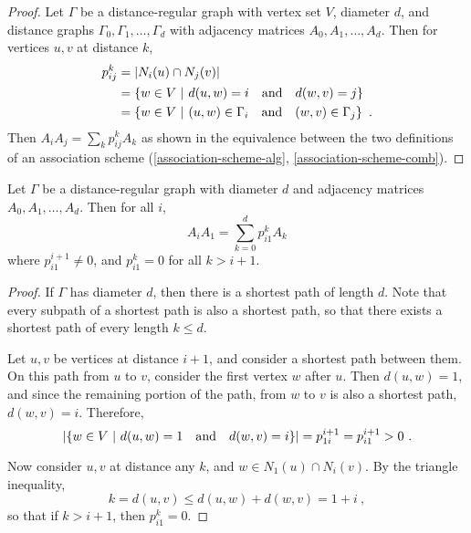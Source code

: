 \documentclass{report}
\begin{document}
    \begin{proof}\label{drg-mult-closed}
      Let $\Gamma$ be a distance-regular graph with vertex set $V$, diameter
      $d$, and distance graphs $\Gamma_0, \Gamma_1, \ldots, \Gamma_d$
      with adjacency matrices $A_0, A_1, \ldots, A_d$.
      Then for vertices $u, v$ at distance $k$,
      \begin{alignat*}{2}
        p_{ij}^k &= \left\lvert N_i(u) \cap N_j(v) \right\rvert \\
        &= \left\lbrace  w \in V \ \middle| \ d(u, w) = i \quad\text{and}\quad d(w, v) = j  \right\rbrace \\
        &= \left\lbrace  w \in V \ \middle| \ (u, w) \in \Gamma_i \quad\text{and}\quad (w, v) \in \Gamma_j  \right\rbrace
        \ .
      \end{alignat*}
      Then $A_i A_j = \sum_k p_{ij}^k A_k$ as shown in the equivalence between
      the two definitions of an association scheme
      (\ref{association-scheme-alg}, \ref{association-scheme-comb}).
    \end{proof}

    \begin{lem}\label{drg-mult-restricted}
      Let $\Gamma$ be a distance-regular graph with diameter $d$ and
      adjacency matrices $A_0, A_1, \ldots, A_d$.  Then for all $i$,
      $$
        A_i A_1 = \sum_{k=0}^d p_{i1}^k A_k
      $$
      where $p_{i1}^{i+1} \neq 0$,
      and $p_{i1}^k = 0$ for all $k > i + 1$.
    \end{lem}

    \begin{proof}
      If $\Gamma$ has diameter $d$, then there is a shortest path of length $d$.
      Note that every subpath of a shortest path is also a shortest path, so
      that there exists a shortest path of every length $k \leq d$.

      Let $u, v$ be vertices at distance $i+1$, and consider a shortest path
      between them.  On this path from $u$ to $v$, consider the first vertex $w$
      after $u$.  Then $d(u, w) = 1$, and since the remaining portion of the
      path, from $w$ to $v$ is also a shortest path, $d(w, v) = i$.  Therefore,
      $$
      \left\lvert \left\lbrace  w \in V \ \middle| \ d(u, w) = 1 \quad\text{and}\quad d(w, v) = i  \right\rbrace \right\rvert
      = p_{1i}^{i+1} = p_{i1}^{i+1} > 0 \ .
      $$

      Now consider $u, v$ at distance any $k$, and $w \in N_1(u) \cap N_i(v)$.
      By the triangle inequality,
      $$
        k = d(u, v) \leq d(u, w) + d(w, v)
        = 1 + i
        \ ,
      $$
      so that if $k > i + 1$, then $p_{i1}^k = 0$.
    \end{proof}
\end{document}
